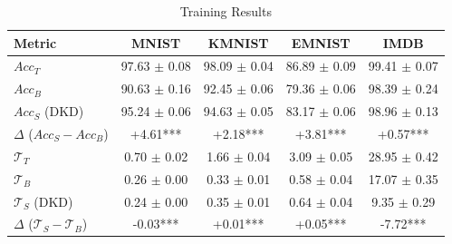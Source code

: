 \begin{table}
\caption{Training Results}
\label{tab:combined-train-dkd}
\begin{tabular}{|l|c|c|c|c|}
\hline
Metric & MNIST & KMNIST & EMNIST & IMDB \\
\hline
$Acc_T$ & 97.63 $\pm$ 0.08 & 98.09 $\pm$ 0.04 & 86.89 $\pm$ 0.09 & 99.41 $\pm$ 0.07 \\
\hline
$Acc_B$ & 90.63 $\pm$ 0.16 & 92.45 $\pm$ 0.06 & 79.36 $\pm$ 0.06 & 98.39 $\pm$ 0.24 \\
\hline
$Acc_S$ (DKD) & 95.24 $\pm$ 0.06 & 94.63 $\pm$ 0.05 & 83.17 $\pm$ 0.06 & 98.96 $\pm$ 0.13 \\
\hline
$\Delta$ ($Acc_S-Acc_B$) & +4.61*** & +2.18*** & +3.81*** & +0.57*** \\
\hline
\hline
$\mathcal{T}_T$ & 0.70 $\pm$ 0.02 & 1.66 $\pm$ 0.04 & 3.09 $\pm$ 0.05 & 28.95 $\pm$ 0.42 \\
\hline
$\mathcal{T}_B$ & 0.26 $\pm$ 0.00 & 0.33 $\pm$ 0.01 & 0.58 $\pm$ 0.04 & 17.07 $\pm$ 0.35 \\
\hline
$\mathcal{T}_S$ (DKD)& 0.24 $\pm$ 0.00 & 0.35 $\pm$ 0.01 & 0.64 $\pm$ 0.04 & 9.35 $\pm$ 0.29 \\
\hline
$\Delta$ ($\mathcal{T}_S-\mathcal{T}_B$) & -0.03*** & +0.01*** & +0.05*** & -7.72*** \\
\hline
\end{tabular}
\end{table}
